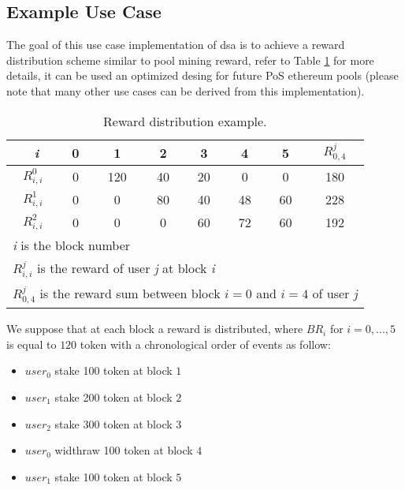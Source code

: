 \documentclass[a4paper]{article}
\begin{document}
\subsection{Example Use Case}
\noindent
The goal of this use case implementation of \acrshort{dsa} is to achieve a reward distribution scheme similar to pool mining reward, refer to Table \ref{tab:table_reward_example} for more details, it can be used an optimized desing for future PoS ethereum pools (please note that many other use cases can be derived from this implementation).\par
\begin{table}[h!]
  \begin{center}
    \caption{Reward distribution example.}
    \label{tab:table_reward_example}
    \begin{tabular}{ c | c c c c c c || c }
      \hline \
  	  \textit{i} & 0 & 1 &  2 & 3 & 4 & 5 & $\mathit{R_{0,4}^j}$ \\
  	  \hline
      $R_{i,i}^0$ & 0 & 120 & 40 & 20 & 0 & 0 & 180 \\ 
      $R_{i,i}^1$ & 0 & 0 & 80 & 40 & 48 & 60 & 228 \\ 
      $R_{i,i}^2$ & 0 & 0 & 0 & 60 & 72 & 60 & 192 \\
      \hline
      \multicolumn{8}{l}{\footnotesize \textit{i} is the block number}\\
      \multicolumn{8}{l}{\footnotesize $R_{i,i}^j$ is the reward of user \textit{j} at block \textit{i}}\\
      \multicolumn{8}{l}{\footnotesize $R_{0,4}^j$ is the reward sum between block $i=0$ and $i=4$ of user \textit{j} }\\
    \end{tabular}
  \end{center}
\end{table}
\noindent
We suppose that at each block a reward is distributed, where $\mathit{BR}_i$ for $i=0,...,5$ is equal to $120$ \acrshort{token} with a chronological order of events as follow:
\begin{itemize}
  \setlength\itemsep{0.1em}
  \item $user_0$ stake 100 \acrshort{token} at block $1$
  \item $user_1$ stake 200 \acrshort{token} at block $2$
  \item $user_2$ stake 300 \acrshort{token} at block $3$
  \item $user_0$ widthraw 100 \acrshort{token} at block $4$
  \item $user_1$ stake 100 \acrshort{token} at block $5$
\end{itemize}
\end{document}
